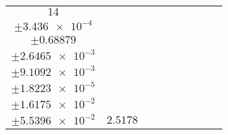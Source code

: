 \documentclass[8pt]{article}
\begin{document}
\begin{longtable}[l]{c c c c c c c c c}
$\num{14}$ & \begin{tabular}[c]{@{}c@{}}$\num{2.942e-2}$ \\ $\pm\num{3.436e-4}$\end{tabular} & \begin{tabular}[c]{@{}c@{}}$\num{0.30809}$ \\ $\pm\num{0.68879}$\end{tabular} & \begin{tabular}[c]{@{}c@{}}$\num{7.5568}$ \\ $\pm\num{2.6465e-3}$\end{tabular} & \begin{tabular}[c]{@{}c@{}}$\num{2.151e+3}$ \\ $\pm\num{9.1092e-3}$\end{tabular} & \begin{tabular}[c]{@{}c@{}}$\num{4.3032}$ \\ $\pm\num{1.8223e-5}$\end{tabular} & \begin{tabular}[c]{@{}c@{}}$\num{1.1405}$ \\ $\pm\num{1.6175e-2}$\end{tabular} & \begin{tabular}[c]{@{}c@{}}$\num{4.1296}$ \\ $\pm\num{5.5396e-2}$\end{tabular} & $\num{2.5178}$\\
\bottomrule
\end{longtable}
\end{document}
